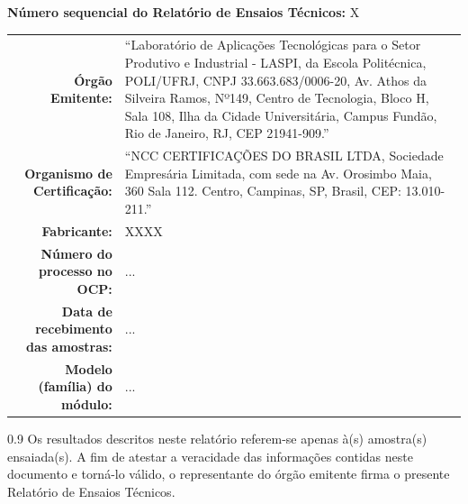 \documentclass[12pt, a4paper]{article}
\begin{document}
\begin{titlepage}
    \vfill %
    
    \begin{center} 
        \textbf{Número sequencial do Relatório de Ensaios Técnicos:} X
    \end{center}
    
    \vfill %
    
    \begin{tabularx}{\textwidth}{ >{\bfseries}r X }
        Órgão Emitente: & 
        ``Laboratório de Aplicações Tecnológicas para o Setor Produtivo e Industrial - LASPI, da Escola Politécnica, POLI/UFRJ, CNPJ 33.663.683/0006-20, Av. Athos da Silveira Ramos, Nº149, Centro de Tecnologia, Bloco H, Sala 108, Ilha da Cidade Universitária, Campus Fundão, Rio de Janeiro, RJ, CEP 21941-909.'' \\
        \addlinespace[10pt]
        Organismo de Certificação: & 
        ``NCC CERTIFICAÇÕES DO BRASIL LTDA, Sociedade Empresária Limitada, com sede na Av. Orosimbo Maia, 360 Sala 112. Centro, Campinas, SP, Brasil, CEP: 13.010-211.'' \\
        \addlinespace[10pt]
        Fabricante: & XXXX \\
        \addlinespace[10pt]
        Número do processo no OCP: & ... \\ 
        \addlinespace[10pt]
        Data de recebimento das amostras: & ... \\
        \addlinespace[10pt]
        Modelo (família) do módulo: & ... \\
    \end{tabularx}
    
    \vfill %
    
    \noindent{}%
    \begin{parbox}{0.9\textwidth}
        \small 
        Os resultados descritos neste relatório referem-se apenas à(s) amostra(s) ensaiada(s). 
        A fim de atestar a veracidade das informações contidas neste documento e torná-lo válido, o representante do órgão emitente firma o presente Relatório de Ensaios Técnicos.
    \end{parbox}%
        

\end{titlepage}
\end{document}
